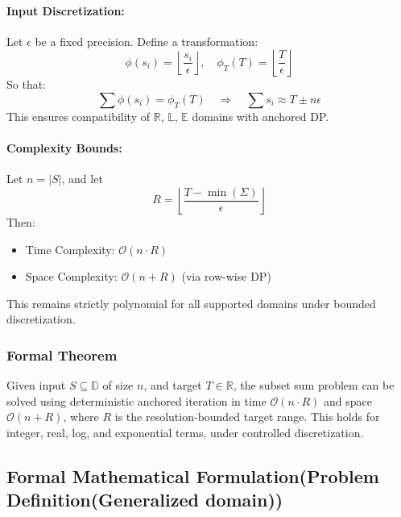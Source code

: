 \documentclass[11pt]{article}
\begin{document}
\paragraph{Input Discretization:}
Let $\epsilon$ be a fixed precision. Define a transformation:
\[
\phi(s_i) = \left\lfloor \frac{s_i}{\epsilon} \right\rfloor, \quad \phi_T(T) = \left\lfloor \frac{T}{\epsilon} \right\rfloor
\]
So that: 
\[
\sum \phi(s_i) = \phi_T(T) \quad \Rightarrow \quad \sum s_i \approx T \pm n\epsilon
\]
This ensures compatibility of $\mathbb{R}$, $\mathbb{L}$, $\mathbb{E}$ domains with anchored DP.

\paragraph{Complexity Bounds:}
Let $n = |S|$, and let
\[
R = \left\lfloor \frac{T - \min(\Sigma)}{\epsilon} \right\rfloor
\]
Then:
\begin{itemize}
    \item Time Complexity: $\mathcal{O}(n \cdot R)$
    \item Space Complexity: $\mathcal{O}(n + R)$ (via row-wise DP)
\end{itemize}
This remains strictly polynomial for all supported domains under bounded discretization.

\vspace{1em}





\subsubsection{Formal Theorem}

\begin{theorem}
Given input $S \subseteq \mathbb{D}$ of size $n$, and target $T \in \mathbb{R}$, the subset sum problem can be solved using deterministic anchored iteration in time $\mathcal{O}(n \cdot R)$ and space $\mathcal{O}(n + R)$, where $R$ is the resolution-bounded target range. This holds for integer, real, log, and exponential terms, under controlled discretization.
\end{theorem}

\vspace{1em}

\subsection*{Formal Mathematical Formulation(Problem Definition(Generalized domain))}
\end{document}
